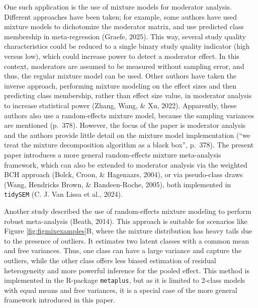 \documentclass[
  english,
  man, noextraspace,floatsintext]{apa6}
\begin{document}
One such application is the use of mixture models for moderator analysis.
Different approaches have been taken; for example, some authors have used mixture models to dichotomize the moderator matrix, and use predicted class membership in meta-regression (Graefe, 2025).
This way, several study quality characteristics could be reduced to a single binary study quality indicator (high versus low), which could increase power to detect a moderator effect.
In this context, moderators are assumed to be measured without sampling error, and thus, the regular mixture model can be used.
Other authors have taken the inverse approach, performing mixture modeling on the effect sizes and then predicting class membership, rather than effect size value, in moderator analysis to increase statistical power (Zhang, Wang, \& Xu, 2022).
Apparently, these authors also use a random-effects mixture model, because the sampling variances are mentioned (p.~378).
However, the focus of the paper is moderator analysis and
the authors provide little detail on the mixture model implementation (``we treat the mixture decomposition algorithm as a black box'', p.~378).
The present paper introduces a more general random-effects mixture meta-analysis framework,
which can also be extended to moderator analysis via the weighted BCH approach (Bolck, Croon, \& Hagenaars, 2004), or via pseudo-class draws (Wang, Hendricks Brown, \& Bandeen-Roche, 2005), both implemented in \texttt{tidySEM} (C. J. Van Lissa et al., 2024).

Another study described the use of random-effects mixture modeling to perform robust meta-analysis (Beath, 2014).
This approach is suitable for scenarios like Figure \ref{fig:figmixexamples}B,
where the mixture distribution has heavy tails due to the presence of outliers.
It estimates two latent classes with a common mean and free variances.
Thus, one class can have a large variance and capture the outliers, while the other class offers less biased estimation of residual heterogeneity and more powerful inference for the pooled effect.
This method is implemented in the R-package \texttt{metaplus},
but as it is limited to 2-class models with equal means and free variances,
it is a special case of the more general framework introduced in this paper.
\end{document}
